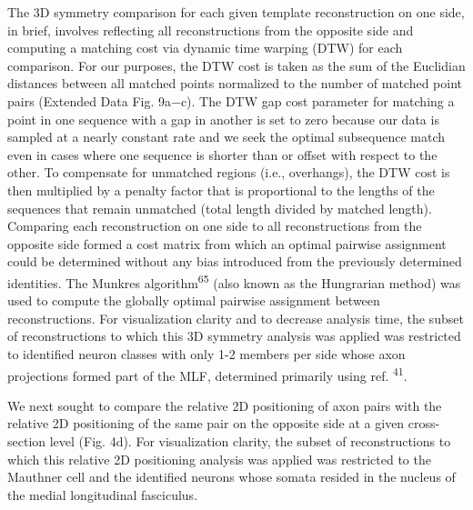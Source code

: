 \documentclass{article}
\begin{document}
The 3D symmetry comparison for each given template reconstruction on one side, in brief, involves reflecting all reconstructions from the opposite side and computing a matching cost via dynamic time warping (DTW) for each comparison. For our purposes, the DTW cost is taken as the sum of the Euclidian distances between all matched points normalized to the number of matched point pairs (Extended Data Fig. 9a−c). The DTW gap cost parameter for matching a point in one sequence with a gap in another is set to zero because our data is sampled at a nearly constant rate and we seek the optimal subsequence match even in cases where one sequence is shorter than or offset with respect to the other. To compensate for unmatched regions (i.e., overhangs), the DTW cost is then multiplied by a penalty factor that is proportional to the lengths of the sequences that remain unmatched (total length divided by matched length). Comparing each reconstruction on one side to all reconstructions from the opposite side formed a cost matrix from which an optimal pairwise assignment could be determined without any bias introduced from the previously determined identities. The Munkres algorithm\textsuperscript{65} (also known as the Hungrarian method) was used to compute the globally optimal pairwise assignment between reconstructions. For visualization clarity and to decrease analysis time, the subset of reconstructions to which this 3D symmetry analysis was applied was restricted to identified neuron classes with only 1-2 members per side whose axon projections formed part of the MLF, determined primarily using ref. \textsuperscript{41}.

We next sought to compare the relative 2D positioning of axon pairs with the relative 2D positioning of the same pair on the opposite side at a given cross-section level (Fig. 4d). For visualization clarity, the subset of reconstructions to which this relative 2D positioning analysis was applied was restricted to the Mauthner cell and the identified neurons whose somata resided in the nucleus of the medial longitudinal fasciculus.
\end{document}
